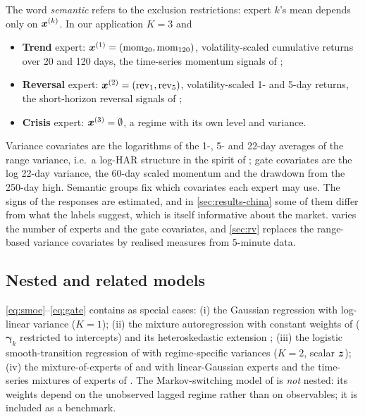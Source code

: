 \noindent The word \emph{semantic} refers to the exclusion restrictions: expert $k$'s mean depends only
on $\bm{x}^{(k)}$. In our application $K=3$ and
\begin{itemize}[leftmargin=1.5em]
\item \textbf{Trend} expert: $\bm{x}^{(1)}=(\mathrm{mom}_{20},\mathrm{mom}_{120})$, volatility-scaled
  cumulative returns over 20 and 120 days, the time-series momentum signals of
  \citet{moskowitz2012time};
\item \textbf{Reversal} expert: $\bm{x}^{(2)}=(\mathrm{rev}_1,\mathrm{rev}_5)$, volatility-scaled
  1- and 5-day returns, the short-horizon reversal signals of \citet{lehmann1990fads};
\item \textbf{Crisis} expert: $\bm{x}^{(3)}=\emptyset$, a regime with its own level and variance.
\end{itemize}
Variance covariates are the logarithms of the 1-, 5- and 22-day averages of the
\citet{parkinson1980extreme} range variance, i.e.\ a log-HAR structure in the spirit of
\citet{corsi2009simple}; gate covariates are the log 22-day variance, the 60-day scaled momentum and
the drawdown from the 250-day high. Semantic groups fix which covariates each expert may use. The
signs of the responses are estimated, and in \cref{sec:results-china} some of them differ from what
the labels suggest, which is itself informative about the market.  varies the number
of experts and the gate covariates, and \cref{sec:rv} replaces the range-based variance covariates by
realised measures from 5-minute data.

\subsection{Nested and related models}

\begin{proposition}[Nesting]\label{prop:nesting}
\eqref{eq:smoe}--\eqref{eq:gate} contains as special cases:
(i) the Gaussian regression with log-linear variance ($K=1$);
(ii) the mixture autoregression with constant weights of \citet{wong2000mixture} ($\bm\gamma_k$
restricted to intercepts) and its heteroskedastic extension \citep{wong2001mixture};
(iii) the logistic smooth-transition regression of \citet{terasvirta1994specification} with
regime-specific variances ($K=2$, scalar $\bm{z}$);
(iv) the mixture-of-experts of \citet{jacobs1991adaptive} and \citet{jordan1994hierarchical} with
linear-Gaussian experts and the time-series mixtures of experts of \citet{carvalho2005mixtures}.
The Markov-switching model of \citet{hamilton1989new} is \emph{not} nested: its weights depend on the
unobserved lagged regime rather than on observables; it is included as a benchmark.
\end{proposition}

